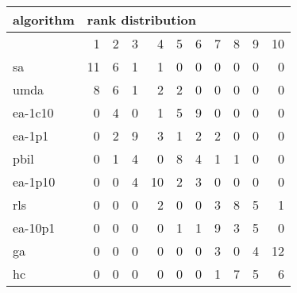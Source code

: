 \begin{tabular}{@{}l*{10}{r}@{}}
\toprule
algorithm & \multicolumn{10}{l}{{rank distribution}}\\
\midrule
& 1 & 2 & 3 & 4 & 5 & 6 & 7 & 8 & 9 & 10\\
\midrule
sa & 11 & 6 & 1 & 1 & 0 & 0 & 0 & 0 & 0 & 0\\
umda & 8 & 6 & 1 & 2 & 2 & 0 & 0 & 0 & 0 & 0\\
ea-1c10 & 0 & 4 & 0 & 1 & 5 & 9 & 0 & 0 & 0 & 0\\
ea-1p1 & 0 & 2 & 9 & 3 & 1 & 2 & 2 & 0 & 0 & 0\\
pbil & 0 & 1 & 4 & 0 & 8 & 4 & 1 & 1 & 0 & 0\\
ea-1p10 & 0 & 0 & 4 & 10 & 2 & 3 & 0 & 0 & 0 & 0\\
rls & 0 & 0 & 0 & 2 & 0 & 0 & 3 & 8 & 5 & 1\\
ea-10p1 & 0 & 0 & 0 & 0 & 1 & 1 & 9 & 3 & 5 & 0\\
ga & 0 & 0 & 0 & 0 & 0 & 0 & 3 & 0 & 4 & 12\\
hc & 0 & 0 & 0 & 0 & 0 & 0 & 1 & 7 & 5 & 6\\
\bottomrule
\end{tabular}
